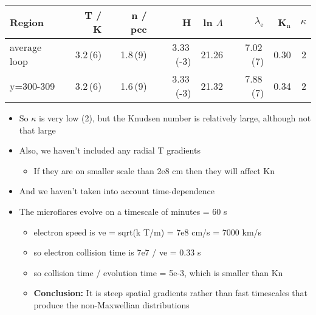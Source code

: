 \documentclass[11pt]{article}
\begin{document}
\begin{center}
\begin{tabular}{lrrrrrrr}
Region & T / K & n / pcc & H & ln \(\Lambda\) & \(\lambda_{\text{e}}\) & K\(_{\text{n}}\) & \(\kappa\)\\
\hline
average loop & 3.2\,(6) & 1.8\,(9) & 3.33\,(-3) & 21.26 & 7.02\,(7) & 0.30 & 2\\
y=300-309 & 3.2\,(6) & 1.6\,(9) & 3.33\,(-3) & 21.32 & 7.88\,(7) & 0.34 & 2\\
\end{tabular}
\end{center}

\begin{itemize}
\item So \(\kappa\) is very low (2), but the Knudsen number is relatively large, although not that large
\item Also, we haven't included any radial T gradients
\begin{itemize}
\item If they are on smaller scale than 2e8 cm then they will affect Kn
\end{itemize}
\item And we haven't taken into account time-dependence
\item The microflares evolve on a timescale of minutes = 60 s
\begin{itemize}
\item electron speed is ve = sqrt(k T/m) = 7e8 cm/s = 7000 km/s
\item so electron collision time is 7e7 / ve = 0.33 s
\item so collision time / evolution time = 5e-3, which is smaller than Kn
\item \textbf{Conclusion:} It is steep spatial gradients rather than fast timescales that produce the non-Maxwellian distributions
\end{itemize}
\end{itemize}
\end{document}
